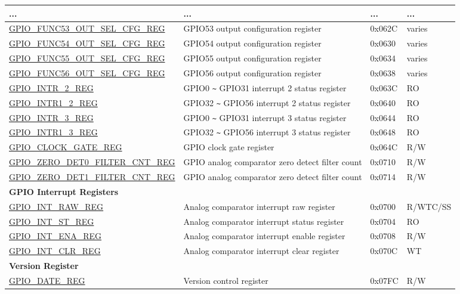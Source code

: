 \begin{longtable}{ | p{5.8cm} | p{7.2cm} | p{1.3cm} | p{2.2cm} | }
... & ... & ... & ... \\ \hline
\hyperref[regdesc:GPIOFUNCNOUTSELCFGREG]{GPIO\_FUNC53\_OUT\_SEL\_CFG\_REG} & GPIO53 output configuration register & 0x062C & varies \\ \hline
\hyperref[regdesc:GPIOFUNCNOUTSELCFGREG]{GPIO\_FUNC54\_OUT\_SEL\_CFG\_REG} & GPIO54 output configuration register & 0x0630 & varies \\ \hline
\hyperref[regdesc:GPIOFUNCNOUTSELCFGREG]{GPIO\_FUNC55\_OUT\_SEL\_CFG\_REG} & GPIO55 output configuration register & 0x0634 & varies \\ \hline
\hyperref[regdesc:GPIOFUNCNOUTSELCFGREG]{GPIO\_FUNC56\_OUT\_SEL\_CFG\_REG} & GPIO56 output configuration register & 0x0638 & varies \\ \hline
\hyperref[regdesc:GPIOINTR2REG]{GPIO\_INTR\_2\_REG} & GPIO0 \verb+~+ GPIO31 interrupt 2 status register & 0x063C & RO \\ \hline
\hyperref[regdesc:GPIOINTR12REG]{GPIO\_INTR1\_2\_REG} & GPIO32 \verb+~+ GPIO56 interrupt 2 status register & 0x0640 & RO \\ \hline
\hyperref[regdesc:GPIOINTR3REG]{GPIO\_INTR\_3\_REG} & GPIO0 \verb+~+ GPIO31 interrupt 3 status register & 0x0644 & RO \\ \hline
\hyperref[regdesc:GPIOINTR13REG]{GPIO\_INTR1\_3\_REG} & GPIO32 \verb+~+ GPIO56 interrupt 3 status register & 0x0648 & RO \\ \hline
\hyperref[regdesc:GPIOCLOCKGATEREG]{GPIO\_CLOCK\_GATE\_REG} & GPIO clock gate register & 0x064C & R/W \\ \hline
\hyperref[regdesc:GPIOZERODET0FILTERCNTREG]{GPIO\_ZERO\_DET0\_FILTER\_CNT\_REG} & GPIO analog comparator zero detect filter count & 0x0710 & R/W \\ \hline
\hyperref[regdesc:GPIOZERODET1FILTERCNTREG]{GPIO\_ZERO\_DET1\_FILTER\_CNT\_REG} & GPIO analog comparator zero detect filter count & 0x0714 & R/W \\ \hline
\multicolumn{4}{|l|}{\textbf{GPIO Interrupt Registers}} \\ \hline
\hyperref[regdesc:GPIOINTRAWREG]{GPIO\_INT\_RAW\_REG} & Analog comparator interrupt raw register & 0x0700 & R/WTC/SS \\ \hline
\hyperref[regdesc:GPIOINTSTREG]{GPIO\_INT\_ST\_REG} & Analog comparator interrupt status register& 0x0704 & RO \\ \hline
\hyperref[regdesc:GPIOINTENAREG]{GPIO\_INT\_ENA\_REG} & Analog comparator interrupt enable register& 0x0708 & R/W \\ \hline
\hyperref[regdesc:GPIOINTCLRREG]{GPIO\_INT\_CLR\_REG} & Analog comparator interrupt clear register & 0x070C & WT \\ \hline
\multicolumn{4}{|l|}{\textbf{Version Register}} \\ \hline
\hyperref[regdesc:GPIODATEREG]{GPIO\_DATE\_REG} & Version control register & 0x07FC & R/W \\ \hline
\end{longtable}
